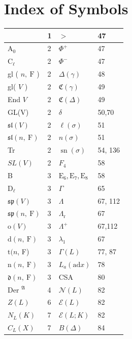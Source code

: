 \documentclass[10pt]{article}
\begin{document}
\section*{Index of Symbols}
\begin{center}
\begin{tabular}{|l|l|l|l|}
\hline
[ $x y$ ] & 1 & $>$ & 47 \\
\hline
$\mathrm{A}_{0}$ & 2 & $\Phi^{+}$ & 47 \\
\hline
$\mathrm{C}_{\ell}$ & 2 & $\Phi^{-}$ & 47 \\
\hline
gl ( $n, \mathrm{~F}$ ) & 2 & $\Delta(\gamma)$ & 48 \\
\hline
gl( $V$ ) & 2 & $\mathfrak{C}(\gamma)$ & 49 \\
\hline
End $V$ & 2 & $\mathfrak{C}(\Delta)$ & 49 \\
\hline
GL(V) & 2 & $\delta$ & 50,70 \\
\hline
$\mathfrak{s l}(V)$ & 2 & $\ell(\sigma)$ & 51 \\
\hline
$\mathfrak{s l}(n, \mathrm{~F})$ & 2 & $n(\sigma)$ & 51 \\
\hline
Tr & 2 & $\operatorname{sn}(\sigma)$ & 54, 136 \\
\hline
$S L(V)$ & 2 & $F_{4}$ & 58 \\
\hline
B & 3 & $\mathrm{E}_{6}, \mathrm{E}_{7}, \mathrm{E}_{8}$ & 58 \\
\hline
$\mathrm{D}_{\ell}$ & 3 & $\Gamma$ & 65 \\
\hline
$\mathfrak{s p}(V)$ & 3 & $\Lambda$ & 67, 112 \\
\hline
$\mathfrak{s p}(n, \mathrm{~F})$ & 3 & $\Lambda_{\mathrm{r}}$ & 67 \\
\hline
$\mathrm{o}(V)$ & 3 & $\Lambda^{+}$ & 67,112 \\
\hline
$\mathrm{d}(n, \mathrm{~F})$ & 3 & $\lambda_{1}$ & 67 \\
\hline
$\mathrm{t}(n$, F) & 3 & $\Gamma(L)$ & 77, 87 \\
\hline
$\mathrm{n}(n, \mathrm{~F})$ & 3 & $L_{a}(\mathrm{ad} x)$ & 78 \\
\hline
$\mathfrak{d}(n, \mathrm{~F})$ & 3 & CSA & 80 \\
\hline
Der ${ }^{\mathfrak{A}}$ & 4 & $\mathscr{N}(L)$ & 82 \\
\hline
$Z(L)$ & 6 & $\mathscr{E}(L)$ & 82 \\
\hline
$N_{L}(K)$ & 7 & $\mathscr{E}(L ; K)$ & 82 \\
\hline
$C_{L}(X)$ & 7 & $B(\Delta)$ & 84 \\
\hline

\end{tabular}
\end{center}
\end{document}
